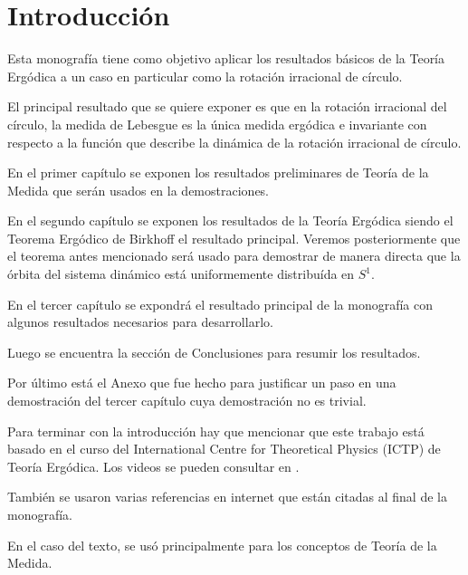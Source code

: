 \chapter*{Introducción}

Esta monografía tiene como objetivo aplicar los resultados básicos de la Teoría Ergódica a un caso en particular como la rotación irracional de círculo.

El principal resultado que se quiere exponer es que en la rotación irracional del círculo, la medida de Lebesgue es la única medida ergódica e invariante con respecto a la función que describe la dinámica de la rotación irracional de círculo.

En el primer capítulo se exponen los resultados preliminares de Teoría de la Medida que serán usados en la demostraciones.

En el segundo capítulo se exponen los resultados de la Teoría Ergódica siendo el Teorema Ergódico de Birkhoff el resultado principal. Veremos posteriormente que el teorema antes mencionado será usado para demostrar de manera directa que la órbita del sistema dinámico está uniformemente distribuída en $S^1$.

En el tercer capítulo se expondrá el resultado principal de la monografía con algunos resultados necesarios para desarrollarlo.

Luego se encuentra la sección de Conclusiones para resumir los resultados.

Por último está el Anexo que fue hecho para justificar un paso en una demostración del tercer capítulo cuya demostración no es trivial.

Para terminar con la introducción hay que mencionar que este trabajo está basado en el curso del International Centre for Theoretical Physics (ICTP) de Teoría Ergódica. Los videos se pueden consultar en \cite{youtube}.

También se usaron varias referencias en internet que están citadas al final de la monografía.

En el caso del texto, se usó principalmente \cite{bartle} para los conceptos de Teoría de la Medida.
